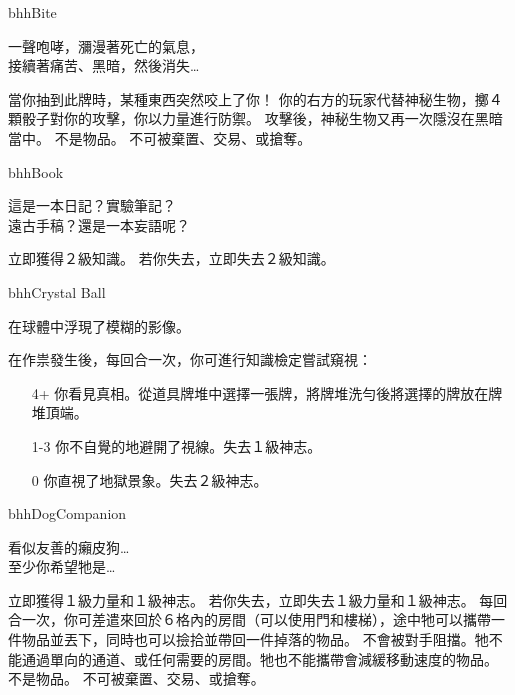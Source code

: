 %
\begin{OmenCard}{bhh}{Bite}{}
	\begin{CardStory}
		一聲咆哮，瀰漫著死亡的氣息，\\
		接續著痛苦、黑暗，然後消失…
	\end{CardStory}
	當你抽到此牌時，某種東西突然咬上了你！\smallbreak
	你的右方的玩家代替神秘生物，擲４顆骰子對你的攻擊，你以力量進行防禦。\smallbreak
	攻擊後，神秘生物又再一次隱沒在黑暗當中。\smallbreak
	\ThisName{}不是物品。\smallbreak
	\ThisName{}不可被棄置、交易、或搶奪。\smallbreak
\end{OmenCard}%
\linebreak[0]%
\begin{OmenCard}{bhh}{Book}{}
	\begin{CardStory}
		這是一本日記？實驗筆記？\\
		遠古手稿？還是一本妄語呢？
	\end{CardStory}
	立即獲得２級知識。\smallbreak
	若你失去\ThisName{}，立即失去２級知識。\smallbreak
\end{OmenCard}%
\linebreak[0]%
\begin{OmenCard}{bhh}{Crystal Ball}{}
	\begin{CardStory}
		在球體中浮現了模糊的影像。
	\end{CardStory}
	在作祟發生後，每回合一次，你可進行知識檢定嘗試窺視\ThisName{}：
	\begin{itemize}
		\item[4+] 你看見真相。從道具牌堆中選擇一張牌，將牌堆洗勻後將選擇的牌放在牌堆頂端。
		\item[1-3] 你不自覺的地避開了視線。失去１級神志。
		\item[0] 你直視了地獄景象。失去２級神志。
	\end{itemize}
\end{OmenCard}%
\linebreak[0]%
\begin{OmenCard}{bhh}{Dog}{Companion}
	\begin{CardStory}
		看似友善的癩皮狗…\\
		至少你希望牠是…
	\end{CardStory}
	立即獲得１級力量和１級神志。\smallbreak
	若你失去\ThisName{}，立即失去１級力量和１級神志。\smallbreak
	每回合一次，你可差遣\ThisName{}來回於６格內的房間（可以使用門和樓梯），途中牠可以攜帶一件物品並丟下，同時也可以撿拾並帶回一件掉落的物品。\smallbreak
	\ThisName{}不會被對手阻擋。牠不能通過單向的通道、或任何需要\RollAny{}的房間。牠也不能攜帶會減緩移動速度的物品。\smallbreak
	\ThisName{}不是物品。\smallbreak
	\ThisName{}不可被棄置、交易、或搶奪。\smallbreak
\end{OmenCard}%
